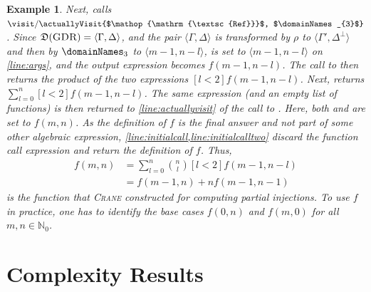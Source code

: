 \documentclass{article}
\newtheorem{example}{Example}
\newcommand{\Done}{\domainNames_{1}}
\newcommand{\Dthree}{\domainNames_{3}}
\DeclareMathOperator{\GDR}{\textsc{GDR}}
\DeclareMathOperator{\Reff}{\textsc{Ref}}
\begin{document}
\begin{example}
  Next, \actuallyVisit{$\land$, $\Dthree$} calls
  $\visit/\actuallyVisit{$\Reff$, $\Dthree$}$. Since
  $\mathfrak{D}(\GDR) = \langle \Gamma, \Delta \rangle$, and the pair
  $\langle\Gamma, \Delta\rangle$ is transformed by $\rho$ to
  $\langle\Gamma', \Delta^{\bot}\rangle$ and then by $\Dthree{}$ to
  $\langle m-1, n-l \rangle$, \args is set to $\langle m-1, n-l \rangle$ on
  \cref{line:args}, and the output expression becomes $f(m-1, n-l)$. The call to
  \actuallyVisit{$\land$, $\Dthree$} then returns the product of the two
  expressions $[l<2]f(m-1, n-l)$. Next, \actuallyVisit{$\bigvee$, $\Done$}
  returns $\sum_{l=0}^{n}[l<2]f(m-1,n-l)$. The same expression (and an empty
  list of functions) is then returned to \cref{line:actuallyvisit} of the call
  to \visit{$\GDR$, $\Done$}. Here, both \functionCall and \functionSignature
  are set to $f(m, n)$. As the definition of $f$ is the final answer and not
  part of some other algebraic expression,
  \cref{line:initialcall,line:initialcalltwo} discard the function call
  expression and return the definition of $f$. Thus,
  \begin{align}
    f(m, n) &= \sum_{l = 0}^{n} \binom{n}{l} [l < 2] f(m-1, n-l)\nonumber \\
            &= f(m-1, n) + n f(m-1, n-1)\label{eq:solution}
  \end{align}
  is the function that \textsc{Crane} constructed for computing partial
  injections. To use $f$ in practice, one has to identify the base cases
  $f(0, n)$ and $f(m, 0)$ for all $m, n \in \mathbb{N}_{0}$.
\end{example}

\section{Complexity Results}\label{sec:results}
\end{document}
